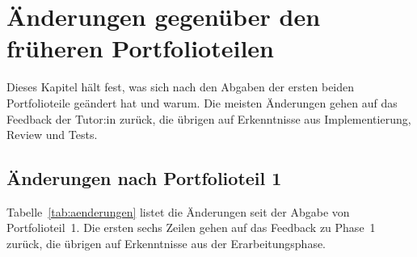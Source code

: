 \section{Änderungen gegenüber den früheren Portfolioteilen}\label{sec:aenderungen}
Dieses Kapitel hält fest, was sich nach den Abgaben der ersten beiden Portfolioteile geändert hat und warum. Die meisten Änderungen gehen auf das Feedback der Tutor:in zurück, die übrigen auf Erkenntnisse aus Implementierung, Review und Tests.

\subsection{Änderungen nach Portfolioteil 1}
Tabelle~\ref{tab:aenderungen} listet die Änderungen seit der Abgabe von Portfolioteil~1. Die ersten sechs Zeilen gehen auf das Feedback zu Phase~1 zurück, die übrigen auf Erkenntnisse aus der Erarbeitungsphase.


